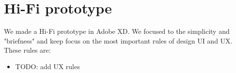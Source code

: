 \section{Hi-Fi prototype}\label{sec:hi-fi-prototype}
We made a Hi-Fi prototype in Adobe XD.
We focused to the simplicity and "briefness" and keep focus on the most important rules of design UI and UX.
These rules are:
\begin{itemize}
    \item TODO: add UX rules
\end{itemize}







